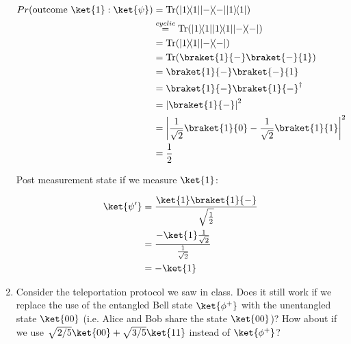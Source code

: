 \documentclass{article}
\newcommand{\ketbra}[2]{|#1\rangle\!\langle #2|}
\newcommand{\trace}{{\rm Tr}}
\newcommand{\abs}[1]{\left\lvert #1 \right\rvert}
\begin{document}
\begin{enumerate}
        $$\begin{aligned}
            Pr(\text{outcome }\ket{1}: \ket{\psi}) & =\trace(\ketbra{1}{1}\ketbra{-}{-}\ketbra{1}{1})                         \\
                                                   & \overset{cyclic}{=}\trace(\ketbra{1}{1}\ketbra{1}{1}\ketbra{-}{-})       \\
                                                   & =\trace(\ketbra{1}{1}\ketbra{-}{-})                                      \\
                                                   & =\trace(\braket{1}{-}\braket{-}{1})                                      \\
                                                   & =\braket{1}{-}\braket{-}{1}                                              \\
                                                   & =\braket{1}{-}\braket{1}{-}^\dagger                                      \\
                                                   & =\abs{\braket{1}{-}}^2                                                   \\
                                                   & =\abs{\frac{1}{\sqrt{2}}\braket{1}{0}-\frac{1}{\sqrt{2}}\braket{1}{1}}^2 \\
                                                   & =\frac{1}{2}                                                             \\
          \end{aligned}$$

        Post measurement state if we measure $\ket{1}$:

        $$\begin{aligned}
            \ket{\psi'} & =\frac{\ket{1}\braket{1}{-}}{\sqrt{\frac{1}{2}}}       \\
                        & =\frac{-\ket{1}\frac{1}{\sqrt{2}}}{\frac{1}{\sqrt{2}}} \\
                        & =-\ket{1}                                              \\
          \end{aligned}$$

  \item Consider the teleportation protocol we saw in class. Does it still work if we replace the use of the entangled Bell state $\ket{\phi^+}$ with the unentangled state $\ket{00}$ (i.e. Alice and Bob share the state $\ket{00}$)? How about if we use $\sqrt{2/5}\ket{00}+\sqrt{3/5}\ket{11}$ instead of $\ket{\phi^+}$?


\end{enumerate}
\end{document}
